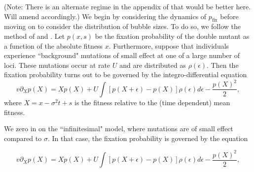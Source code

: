 \documentclass[rmp]{revtex4}
\begin{document}
\iffalse
(Note: There is an alternate regime in the appendix of \citet{good_2014} that would be better here. Will amend accordingly.)
We begin by considering the dynamics of $p_{\mathrm {fix}}$ before moving on to consider the distribution of bubble sizes.
To do so, we follow the method of \citet{good_2012} and \citet{good_2014}.
Let $p(x,s)$ be the fixation probability of the double mutant as a function of the absolute fitness $x$.
Furthermore, suppose that individuals experience ``background" mutations of small effect at one of a large number of loci.
These mutations occur at rate $U$ and are distributed as $\rho(\epsilon)$.
Then the fixation probability turns out to be governed by the integro-differential equation
\begin{equation}
v \partial_X p(X) = X p(X) + U \int \left[ p(X+\epsilon) - p(X)\right]\rho(\epsilon) d\epsilon - \frac{p(X)^2}{2},
\end{equation}
where $X = x-\sigma^2 t+s$ is the fitness relative to the (time dependent) mean fitness.

We zero in on the ``infinitesimal" model, where mutations are of small effect compared to $\sigma$.
In that case, the fixation probability is governed by the equation

\begin{equation}
v \partial_X p(X) = X p(X) + U \int \left[ p(X+\epsilon) - p(X)\right]\rho(\epsilon) d\epsilon - \frac{p(X)^2}{2},
\end{equation}
\end{document}
